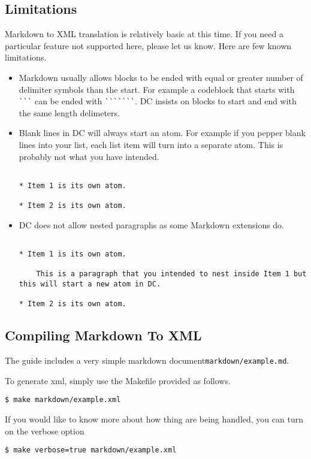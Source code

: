 \subsection{Limitations}

Markdown to XML translation is relatively basic at this time.  If you need a particular feature not supported here, please let us know.
%
Here are few known limitations.
\begin{itemize}
\item Markdown usually allows blocks to be ended with equal or greater number of delimiter symbols than the start. For example a codeblock that starts with \lstinline!```! can be ended with \lstinline!```````!.  DC insists on blocks to start and end with the same length delimeters.

\item Blank lines in DC will always start an atom.  For example if you pepper blank lines into your list, each list item will turn into a separate atom.  This is probably not what you have intended.  
\begin{lstlisting}

* Item 1 is its own atom.

* Item 2 is its own atom.

\end{lstlisting}

\item DC does not allow nested paragraphs as some Markdown extensions do.  

\begin{lstlisting}

* Item 1 is its own atom.

    This is a paragraph that you intended to nest inside Item 1 but  this will start a new atom in DC.  

* Item 2 is its own atom.

\end{lstlisting}

\end{itemize}


\subsection{Compiling Markdown To XML}

The guide includes a very simple markdown document\lstinline`markdown/example.md`.

\begin{gram}
To generate xml, simply use the Makefile provided as follows.
%
\begin{lstlisting}
$ make markdown/example.xml
\end{lstlisting}
%
If you would like to know more about how thing are being handled, you can turn on the verbose option
%
\begin{lstlisting}
$ make verbose=true markdown/example.xml 
\end{lstlisting}
\end{gram}

